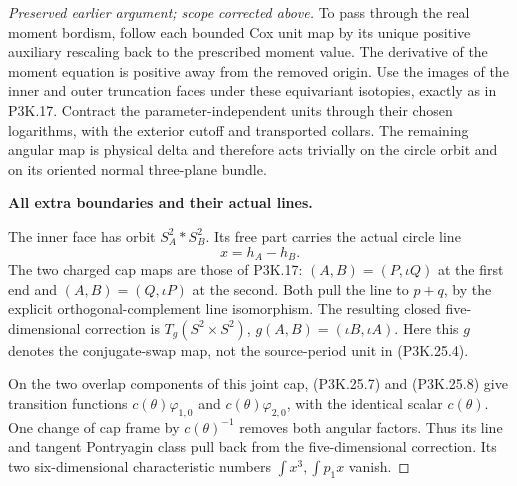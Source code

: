 \begin{proof}[Preserved earlier argument; scope corrected above]
To pass through the real moment bordism, follow each bounded
Cox unit map by its unique positive auxiliary rescaling back
to the prescribed moment value. The derivative of the moment
equation is positive away from the removed origin. Use the
images of the inner and outer truncation faces under these
equivariant isotopies, exactly as in P3K.17. Contract the
parameter-independent units through their chosen logarithms,
with the exterior cutoff and transported collars. The
remaining angular map is physical delta and therefore acts
trivially on the circle orbit and on its oriented normal
three-plane bundle.

\par\medskip\noindent\textbf{All extra boundaries and their actual lines.}\enspace

The inner face has orbit \(S^2_A*S^2_B\). Its free part carries
the actual circle line
\[
                       x=h_A-h_B.
                                                        \tag{P3K.25.9}
\]
The two charged cap maps are those of P3K.17:
\((A,B)=(P,\iota Q)\) at the first end and
\((A,B)=(Q,\iota P)\) at the second. Both pull the line to
\(p+q\), by the explicit orthogonal-complement line
isomorphism. The resulting closed five-dimensional correction
is \(T_g(S^2\times S^2)\), \(g(A,B)=(\iota B,\iota A)\).
Here this \(g\) denotes the conjugate-swap map, not the
source-period unit in (P3K.25.4).

On the two overlap components of this joint cap, (P3K.25.7)
and (P3K.25.8) give transition functions
\(c(\theta)\varphi_{1,0}\) and
\(c(\theta)\varphi_{2,0}\), with the identical scalar
\(c(\theta)\). One change of cap frame by \(c(\theta)^{-1}\)
removes both angular factors. Thus its line and tangent
Pontryagin class pull back from the five-dimensional
correction. Its two six-dimensional characteristic numbers
\(\int x^3,\int p_1x\) vanish.


\end{proof}

